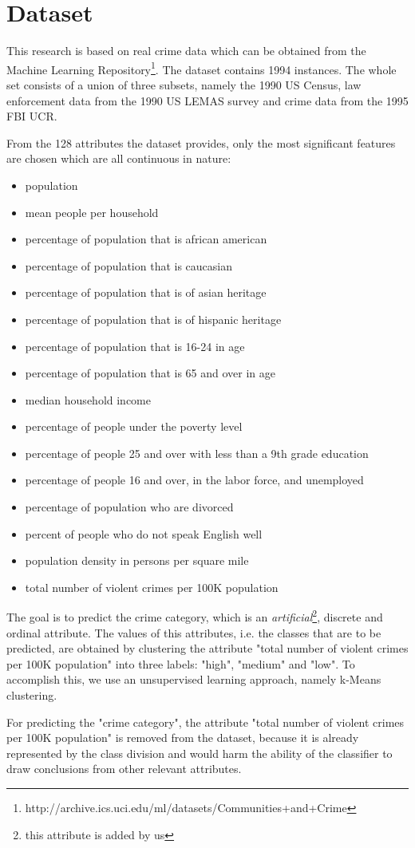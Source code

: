 \section{Dataset}

This research is based on real crime data which can be obtained from the Machine Learning
Repository\footnote{http://archive.ics.uci.edu/ml/datasets/Communities+and+Crime}. The dataset contains 1994 instances. The whole set consists of a union of three subsets, namely the 1990 US Census, law enforcement data from the 1990 US LEMAS survey and crime data from the 1995 FBI UCR.

From the 128 attributes the dataset provides, only the most significant features are chosen which are all
continuous in nature:

\begin{itemize}
	\setlength{\itemsep}{-2pt}
	\item population 
	\item mean people per household
	\item percentage of population that is african american
	\item percentage of population that is caucasian
	\item percentage of population that is of asian heritage 
	\item percentage of population that is of hispanic heritage
	\item percentage of population that is 16-24 in age
	\item percentage of population that is 65 and over in age 
	\item median household income
	\item percentage of people under the poverty level
	\item percentage of people 25 and over with less than a 9th grade education 
	\item percentage of people 16 and over, in the labor force, and unemployed 
	\item percentage of population who are divorced
	\item percent of people who do not speak English well 
	\item population density in persons per square mile
	\item total number of violent crimes per 100K population 
\end{itemize}

The goal is to predict the crime category, which is an
\textit{artificial}\footnote{this attribute is added by us}, discrete and ordinal attribute.
The values of this attributes, i.e.
the classes that are to be predicted, are obtained by clustering the attribute "total number of violent
crimes per 100K population" into three labels: "high", "medium" and "low". To accomplish this, we use an
unsupervised learning approach, namely k-Means clustering.

For predicting the "crime category", the attribute "total number of violent crimes per 100K population" is
removed from the dataset, because it is already represented by the class division and would harm the ability
of the classifier to draw conclusions from other relevant attributes.
